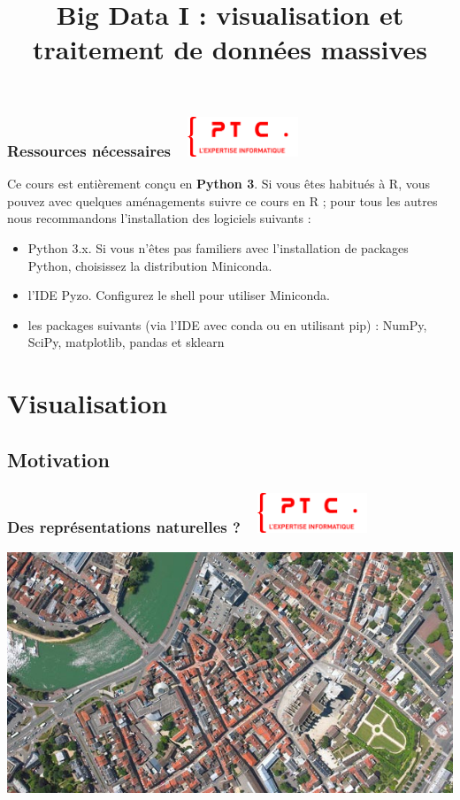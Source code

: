 \documentclass[11pt]{beamer}
\title{Big Data I : visualisation et traitement de données massives}
\author{}
\date{}
\newenvironment{slide}[1]{%
\begin{frame}[environment=slide]
\frametitle{#1~\hfill~\includegraphics[height=1.2cm]{./epitech.png}}
}{%
\end{frame}
}
\begin{document}
\begin{slide}{Ressources nécessaires}

Ce cours est entièrement conçu en \textbf{Python 3}. Si vous êtes habitués à R, vous pouvez avec quelques aménagements suivre ce cours en R ; pour tous les autres nous recommandons l'installation des logiciels suivants :

\vspace{0.2cm}

\begin{itemize}
	\item Python 3.x. Si vous n'êtes pas familiers avec l'installation de packages Python, choisissez la distribution Miniconda.
	\item l'IDE Pyzo. Configurez le shell pour utiliser Miniconda.
	\item les packages suivants (via l'IDE avec conda ou en utilisant pip) : NumPy, SciPy, matplotlib, pandas et sklearn
\end{itemize}

\end{slide}

\section*{Visualisation}

\subsection*{Motivation}

\begin{slide}{Des représentations naturelles ?}

\includegraphics[scale=0.5]{meaux}


\end{slide}
\end{document}
